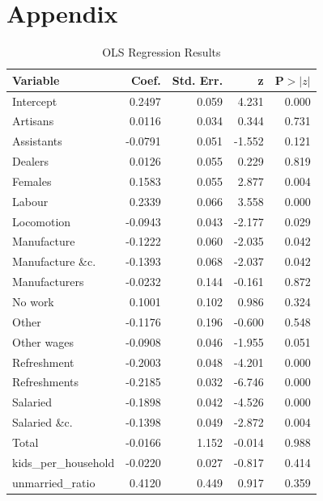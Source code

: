 \appendix %

\chapter{Appendix}

\begin{table}[h]
\centering
\caption{OLS Regression Results}
\label{tab:ols_results}

\scriptsize

\begin{tabular}{|l|r|r|r|r|}
\hline
\textbf{Variable} & \textbf{Coef.} & \textbf{Std. Err.} & \textbf{z} & \textbf{P$>|z|$} \\
\hline

Intercept & 0.2497 & 0.059 & 4.231 & 0.000 \\
Artisans & 0.0116 & 0.034 & 0.344 & 0.731 \\
Assistants & -0.0791 & 0.051 & -1.552 & 0.121 \\
Dealers & 0.0126 & 0.055 & 0.229 & 0.819 \\
Females & 0.1583 & 0.055 & 2.877 & 0.004 \\
Labour & 0.2339 & 0.066 & 3.558 & 0.000 \\
Locomotion & -0.0943 & 0.043 & -2.177 & 0.029 \\
Manufacture & -0.1222 & 0.060 & -2.035 & 0.042 \\
Manufacture \&c. & -0.1393 & 0.068 & -2.037 & 0.042 \\
Manufacturers & -0.0232 & 0.144 & -0.161 & 0.872 \\
No work & 0.1001 & 0.102 & 0.986 & 0.324 \\
Other & -0.1176 & 0.196 & -0.600 & 0.548 \\
Other wages & -0.0908 & 0.046 & -1.955 & 0.051 \\
Refreshment & -0.2003 & 0.048 & -4.201 & 0.000 \\
Refreshments & -0.2185 & 0.032 & -6.746 & 0.000 \\
Salaried & -0.1898 & 0.042 & -4.526 & 0.000 \\
Salaried \&c. & -0.1398 & 0.049 & -2.872 & 0.004 \\
Total & -0.0166 & 1.152 & -0.014 & 0.988 \\
kids\_per\_household & -0.0220 & 0.027 & -0.817 & 0.414 \\
unmarried\_ratio & 0.4120 & 0.449 & 0.917 & 0.359 \\
\hline
\end{tabular}


\end{table}
